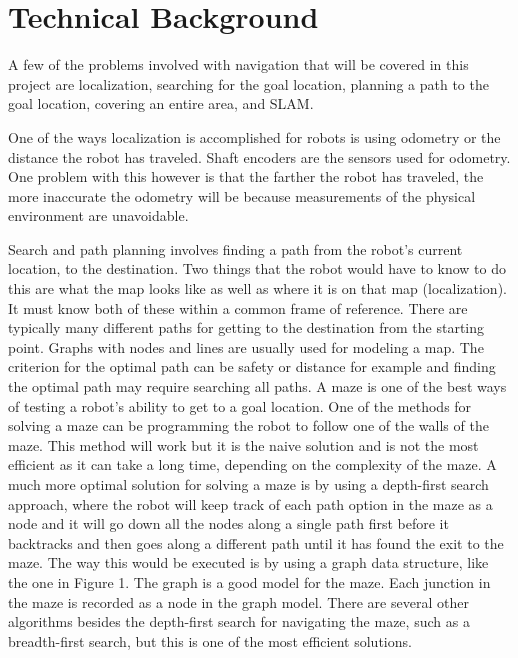 \documentclass[10pt,twocolumn]{article}
\begin{document}
    

    


\section{Technical Background}

A few of the problems involved with navigation that will be covered in this project are localization, searching for the goal location, planning a path to the goal location, covering an entire area, and SLAM.

One of the ways localization is accomplished for robots is using odometry or the distance the robot has traveled. Shaft encoders are the sensors used for odometry. One problem with this however is that the farther the robot has traveled, the more inaccurate the odometry will be because measurements of the physical environment are unavoidable.

Search and path planning involves finding a path from the robot’s current location, to the destination. Two things that the robot would have to know to do this are what the map looks like as well as where it is on that map (localization). It must know both of these within a common frame of reference. There are typically many different paths for getting to the destination from the starting point. Graphs with nodes and lines are usually used for modeling a map. The criterion for the optimal path can be safety or distance for example and finding the optimal path may require searching all paths. A maze is one of the best ways of testing a robot’s ability to get to a goal location. One of the methods for solving a maze can be programming the robot to follow one of the walls of the maze. This method will work but it is the naive solution and is not the most efficient as it can take a long time, depending on the complexity of the maze. A much more optimal solution for solving a maze is by using a depth-first search approach, where the robot will keep track of each path option in the maze as a node and it will go down all the nodes along a single path first before it backtracks and then goes along a different path until it has found the exit to the maze. The way this would be executed is by using a graph data structure, like the one in Figure 1. The graph is a good model for the maze. Each junction in the maze is recorded as a node in the graph model. There are several other algorithms besides the depth-first search for navigating the maze, such as a breadth-first search, but this is one of the most efficient solutions.
\end{document}
